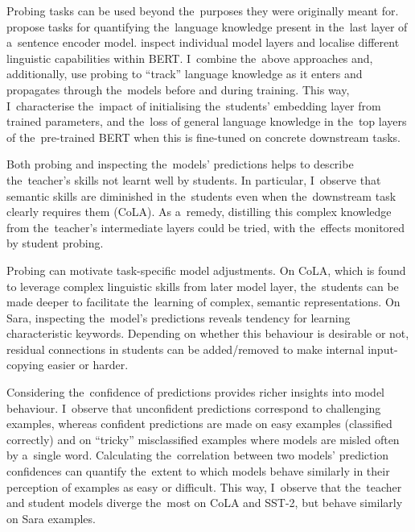 \documentclass[bsc,frontabs,singlespacing,parskip,deptreport]{infthesis}
\begin{document}
{{    Probing tasks can be used beyond the~purposes they were originally meant for.
    \citet{Conneau_2018} propose tasks for quantifying the~language knowledge present in the~last layer of a~sentence encoder model.
    \citet{Tenney_2019a,Tenney_2019b} inspect individual model layers and localise different linguistic capabilities within BERT.
    I~combine the~above approaches and, additionally, use probing to ``track'' language knowledge as it enters and propagates through the~models before and during training.
    This way, I~characterise the~impact of initialising the~students' embedding layer from trained parameters, and the~loss of general language knowledge in the~top layers of the~pre-trained BERT when this is fine-tuned on concrete downstream tasks.

    Both probing and inspecting the~models' predictions helps to describe the~teacher's skills not learnt well by students.
    In particular, I~observe that semantic skills are diminished in the~students even when the~downstream task clearly requires them (CoLA).
    As a~remedy, distilling this complex knowledge from the~teacher's intermediate layers \citep{Jiao_2019,Sun_2019a} could be tried, with the~effects monitored by student probing.

    Probing can motivate task-specific model adjustments.
    On CoLA, which is found to leverage complex linguistic skills from later model layer, the~students can be made deeper to facilitate the~learning of complex, semantic representations.
    On Sara, inspecting the~model's predictions reveals tendency for learning characteristic keywords.
    Depending on whether this behaviour is desirable or not, residual connections in students can be added/removed to make internal input-copying easier or harder.

    Considering the~confidence of predictions provides richer insights into model behaviour.
    I~observe that unconfident predictions correspond to challenging examples, whereas confident predictions are made on easy examples (classified correctly) and on ``tricky'' misclassified examples where models are misled often by a~single word.
    Calculating the~correlation between two models' prediction confidences can quantify the~extent to which models behave similarly in their perception of examples as easy or difficult.
    This way, I~observe that the~teacher and student models diverge the~most on CoLA and SST-2, but behave similarly on Sara examples.

}}
\end{document}
